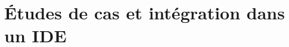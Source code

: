 \chapter{Études de cas et intégration dans un IDE}
    \section{}
        \subsection{}
            \subsubsection{}